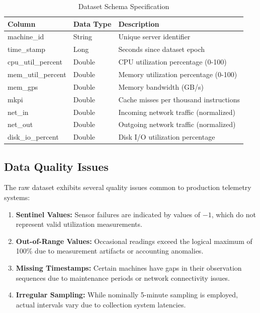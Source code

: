 \documentclass[12pt]{report}
\begin{document}
\begin{table}[H]
\centering
\caption{Dataset Schema Specification}
\label{tab:schema}
\begin{tabular}{lll}
\toprule
\textbf{Column} & \textbf{Data Type} & \textbf{Description} \\
\midrule
machine\_id & String & Unique server identifier \\
time\_stamp & Long & Seconds since dataset epoch \\
cpu\_util\_percent & Double & CPU utilization percentage (0-100) \\
mem\_util\_percent & Double & Memory utilization percentage (0-100) \\
mem\_gps & Double & Memory bandwidth (GB/s) \\
mkpi & Double & Cache misses per thousand instructions \\
net\_in & Double & Incoming network traffic (normalized) \\
net\_out & Double & Outgoing network traffic (normalized) \\
disk\_io\_percent & Double & Disk I/O utilization percentage \\
\bottomrule
\end{tabular}
\end{table}

\subsection{Data Quality Issues}

The raw dataset exhibits several quality issues common to production telemetry systems:

\begin{enumerate}
    \item \textbf{Sentinel Values:} Sensor failures are indicated by values of $-1$, which do not represent valid utilization measurements.
    
    \item \textbf{Out-of-Range Values:} Occasional readings exceed the logical maximum of 100\% due to measurement artifacts or accounting anomalies.
    
    \item \textbf{Missing Timestamps:} Certain machines have gaps in their observation sequences due to maintenance periods or network connectivity issues.
    
    \item \textbf{Irregular Sampling:} While nominally 5-minute sampling is employed, actual intervals vary due to collection system latencies.
\end{enumerate}
\end{document}
